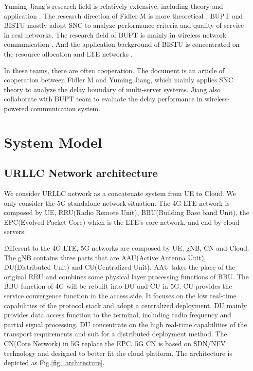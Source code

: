 \documentclass[conference]{IEEEtran}
\begin{document}
Yuming Jiang's research field is relatively extensive, including theory and application \cite{jiang_power}\cite{jiang_Delay}\cite{jiang_theory}\cite{jiang_Wireless}.
The research direction of Fidler M is more theoretical
\cite{MF_cross} \cite{MF_Service} \cite{MF_Estimation} \cite{MF_Random}.
BUPT and BISTU mostly adopt SNC to analyze performance criteria and quality of service in real networks.
The research field of BUPT is mainly in wireless network communication \cite{beiyou_1} \cite{beiyou_2} \cite{beiyou_lei1} \cite{beiyou_lei2}.
And the application background of BISTU is concentrated on the resource allocation and LTE networks
\cite{si_yuan}\cite{xiang_xd}\cite{xu_tong}\cite{zhang_lei}.

In these teams, there are often cooperation. The document \cite{MF_jiang} is an article of cooperation between Fidler M and Yuming Jiang, which mainly applies SNC theory to analyze the delay boundary of multi-server systems. Jiang also collaborate with BUPT team to evaluate the delay performance in wireless-powered communication system\cite{beiyou_1}.

\section{System Model}

\subsection{URLLC Network architecture}
We consider URLLC network as a concatenate system from UE to Cloud. We only consider the 5G standalone network situation.
The 4G LTE network is composed by UE, RRU(Radio Remote Unit), BBU(Building Base band Unit), the EPC(Evolved Packet Core) which is the LTE's core network, and end by cloud servers.

Different to the 4G LTE, 5G networks are composed by UE, gNB, CN and Cloud.
The gNB contains three parts that are AAU(Active Antenna Unit), DU(Distributed Unit) and CU(Centralized Unit).
AAU takes the place of the original RRU and combines some physical layer processing functions of BBU.
The BBU function of 4G will be rebuilt into DU and CU in 5G.
CU provides the service convergence function in the access side. It focuses on the low real-time capabilities of the protocol stack and adopt a centralized deployment.
DU mainly provides data access function to the terminal, including radio frequency and partial signal processing. DU concentrate on the high real-time capabilities of the transport requirements and suit for a distributed deployment method.
The CN(Core Network) in 5G replace the EPC. 5G CN is based on SDN/NFV technology and designed to better fit the cloud platform.
The architecture is depicted as Fig.\ref{fig_architecture}.
\end{document}
